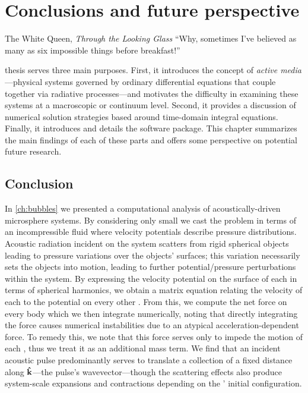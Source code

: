 \chapter{\label{ch:conclusions}Conclusions and future perspective}

\begin{frontquote}{The White Queen, \emph{Through the Looking Glass}}
  ``Why, sometimes I've believed as many as six impossible things before breakfast!''
\end{frontquote}

 thesis serves three main purposes.
First, it introduces the concept of \emph{active media}---physical systems governed by ordinary differential equations that couple together via radiative processes---and motivates the difficulty in examining these systems at a macroscopic or continuum level.
Second, it provides a discussion of numerical solution strategies based around time-domain integral equations.
Finally, it introduces and details the \QuEST{} software package.
This chapter summarizes the main findings of each of these parts and offers some perspective on potential future research. 

\section{Conclusion}

In \cref{ch:bubbles} we presented a computational analysis of acoustically-driven microsphere systems.
By considering only small \bubbles{} we cast the problem in terms of an incompressible fluid where velocity potentials describe pressure distributions.
Acoustic radiation incident on the system scatters from rigid spherical objects leading to pressure variations over the objects' surfaces; this variation necessarily sets the objects into motion, leading to further potential/pressure perturbations within the system.
By expressing the velocity potential on the surface of each \bubble{} in terms of spherical harmonics, we obtain a matrix equation relating the velocity of each \bubble{} to the potential on every other \bubble{}.
From this, we compute the net force on every body which we then integrate numerically, noting that directly integrating the force causes numerical instabilities due to an atypical acceleration-dependent force.
To remedy this, we note that this force serves only to impede the motion of each \bubble{}, thus we treat it as an additional mass term.
We find that an incident acoustic pulse predominantly serves to translate a collection of \bubbles{} a fixed distance along $\vu{k}$---the pulse's wavevector---though the scattering effects also produce system-scale expansions and contractions depending on the \bubbles' initial configuration.

